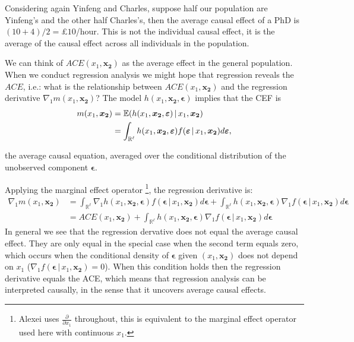 \documentclass[DIV=14,titlepage=false]{scrreprt}
\begin{document}
\begin{example}
Considering again Yinfeng and Charles, suppose half our population are Yinfeng's and the other half Charles's, then the average causal effect of a PhD is $(10+4)/2=$£$10$/hour. This is not the individual causal effect, it is the average of the causal effect across all individuals in the population.
\end{example}
We can think of $ACE(x_1, \mathbf{x_2})$ as the average effect in the general population. When we conduct regression analysis we might hope that regression reveals the $ACE$, i.e.: what is the relationship between $ACE(x_1, \mathbf{x_2})$ and the regression derivative $\nabla_1 m(x_1, \mathbf{x_2})$? The model $h(x_1, \mathbf{x_2},\boldsymbol{\epsilon})$ implies that the CEF is
\begin{align*}
m(x_1, \boldsymbol{x_2}) &= \mathbb{E}(h(x_1, \boldsymbol{x_2}, \boldsymbol{\varepsilon}) \, | \, x_1, \boldsymbol{x_2})\\
&= \int_{\mathbb{R}^{\ell}} h(x_1, \boldsymbol{x_2}, \boldsymbol{\varepsilon}) f(\boldsymbol{\varepsilon} \, | \, x_1, \boldsymbol{x_2}) d\boldsymbol{\varepsilon},
\end{align*}

the average causal equation, averaged over the conditional distribution of the unobserved component $\boldsymbol{\epsilon}$. 

Applying the marginal effect operator \footnote[1]{Alexei uses $\frac{\partial}{\partial x_1}$ throughout, this is equivalent to the marginal effect operator used here with continuous $x_1$.}, the regression derivative is:
\begin{align*}
\nabla_1 m(x_1, \boldsymbol{x_2}) &= \int_{\mathbb{R}^{\ell}} \nabla_1 h(x_1, \boldsymbol{x_2}, \boldsymbol{\epsilon}) f(\boldsymbol{\epsilon} \, | \, x_1, \boldsymbol{x_2}) d\boldsymbol{\epsilon} + \int_{\mathbb{R}^{\ell}} h(x_1, \boldsymbol{x_2}, \boldsymbol{\epsilon}) \nabla_1 f(\boldsymbol{\epsilon} \, | \, x_1, \boldsymbol{x_2}) d\boldsymbol{\epsilon}\\
&= ACE(x_1, \boldsymbol{x_2}) + \int_{\mathbb{R}^{\ell}} h(x_1, \boldsymbol{x_2}, \boldsymbol{\epsilon}) \nabla_1 f(\boldsymbol{\epsilon} \, | \, x_1, \boldsymbol{x_2}) d\boldsymbol{\epsilon}
\end{align*}
In general we see that the regression dervative does not equal the average causal effect. They are only equal in the special case when the second term equals zero, which occurs when the conditional density of $\boldsymbol{\epsilon}$ given $( x_1, \boldsymbol{x_2})$ does not depend on $x_1$ ($\nabla_1 f(\boldsymbol{\epsilon} \, | \, x_1, \boldsymbol{x_2})=0$). When this condition holds then the regression derivative equals the ACE, which means that regression analysis can be interpreted causally, in the sense that it uncovers average causal effects.\\
\end{document}

